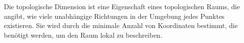 \begin{definition}
    Die topologische Dimension ist eine Eigenschaft eines topologischen Raums, die angibt, wie viele unabhängige Richtungen in der Umgebung jedes Punktes existieren. 
    Sie wird durch die minimale Anzahl von Koordinaten bestimmt, die benötigt werden, um den Raum lokal zu beschreiben.
\end{definition}